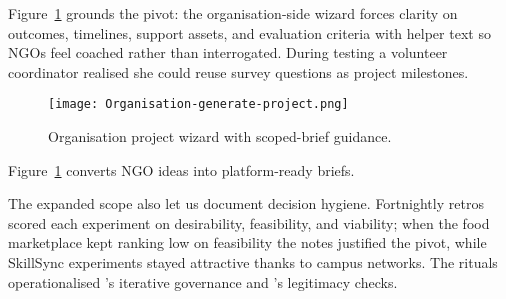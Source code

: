 Figure~\ref{fig:project-creation} grounds the pivot: the organisation-side wizard forces clarity on outcomes, timelines, support assets, and evaluation criteria with helper text so NGOs feel coached rather than interrogated. During testing a volunteer coordinator realised she could reuse survey questions as project milestones.

\begin{figure}[H]
  \centering
  \texttt{[image: Organisation-generate-project.png]}
  \caption{Organisation project wizard with scoped-brief guidance.}
  \label{fig:project-creation}
\end{figure}

Figure~\ref{fig:project-creation} converts NGO ideas into platform-ready briefs.

The expanded scope also let us document decision hygiene. Fortnightly retros scored each experiment on desirability, feasibility, and viability; when the food marketplace kept ranking low on feasibility the notes justified the pivot, while SkillSync experiments stayed attractive thanks to campus networks. The rituals operationalised \citet{Choudary2016}'s iterative governance and \citet{Srnicek2017}'s legitimacy checks.
